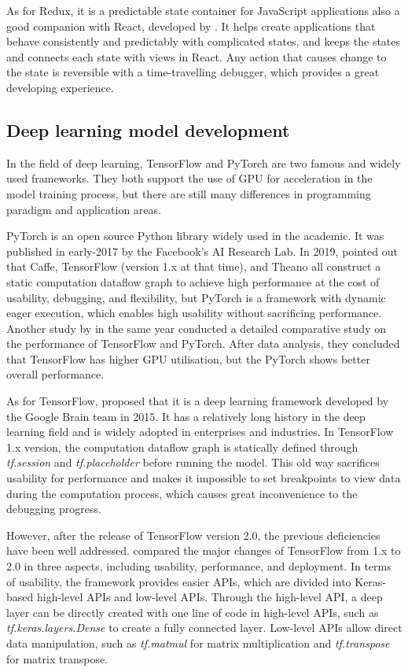 As for Redux, it is a predictable state container for JavaScript applications also a good companion with React, developed by \citet{redux2021}.
It helps create applications that behave consistently and predictably with complicated states, and keeps the states and connects each state with views in React.
Any action that causes change to the state is reversible with a time-travelling debugger, which provides a great developing experience.

\subsection{Deep learning model development}
In the field of deep learning, TensorFlow and PyTorch are two famous and widely used frameworks.
They both support the use of GPU for acceleration in the model training process, but there are still many differences in programming paradigm and application areas.

PyTorch is an open source Python library widely used in the academic.
It was published in early-2017 by the Facebook's AI Research Lab.
In 2019, \citet{steiner2019pytorch} pointed out that Caffe, TensorFlow (version 1.x at that time), and Theano all construct a static computation dataflow graph to achieve high performance at the cost of usability, debugging, and flexibility, but PyTorch is a framework with dynamic eager execution, which enables high usability without sacrificing performance.
Another study by \citet{florencio2019performance} in the same year conducted a detailed comparative study on the performance of TensorFlow and PyTorch.
After data analysis, they concluded that TensorFlow has higher GPU utilisation, but the PyTorch shows better overall performance.

As for TensorFlow, \citet{abadi2015tensorflow} proposed that it is a deep learning framework developed by the Google Brain team in 2015.
It has a relatively long history in the deep learning field and is widely adopted in enterprises and industries.
In TensorFlow 1.x version, the computation dataflow graph is statically defined through \textit{tf.session} and \textit{tf.placeholder} before running the model.
This old way sacrifices usability for performance and makes it impossible to set breakpoints to view data during the computation process, which causes great inconvenience to the debugging progress.

However, after the release of TensorFlow version 2.0, the previous deficiencies have been well addressed.
\citet{singh2020introduction} compared the major changes of TensorFlow from 1.x to 2.0 in three aspects, including usability, performance, and deployment.
In terms of usability, the framework provides easier APIs, which are divided into Keras-based high-level APIs and low-level APIs.
Through the high-level API, a deep layer can be directly created with one line of code in high-level APIs, such as \textit{tf.keras.layers.Dense} to create a fully connected layer.
Low-level APIs allow direct data manipulation, such as \textit{tf.matmul} for matrix multiplication and \textit{tf.transpose} for matrix transpose.

